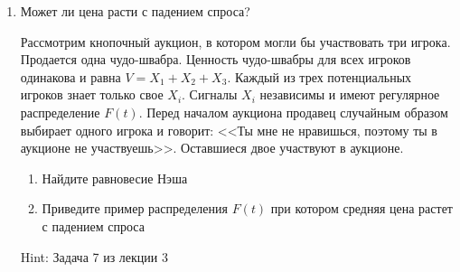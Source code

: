 \begin{enumerate}
\item Может ли цена расти с падением спроса?

Рассмотрим кнопочный аукцион, в котором могли бы участвовать три игрока. Продается одна чудо-швабра. Ценность чудо-швабры для всех игроков одинакова и равна $ V=X_{1}+X_{2}+X_{3} $. Каждый из трех потенциальных игроков знает только свое $ X_{i} $. Сигналы $ X_{i} $ независимы и имеют регулярное распределение $ F(t) $. Перед началом аукциона продавец случайным образом выбирает одного игрока и говорит: <<Ты мне не нравишься, поэтому ты в аукционе не участвуешь>>. Оставшиеся двое участвуют в аукционе. 

\begin{enumerate}
\item Найдите равновесие Нэша
\item Приведите пример распределения $ F(t) $ при котором средняя цена растет с падением спроса
\end{enumerate}

Hint: Задача 7 из лекции 3




\end{enumerate}
